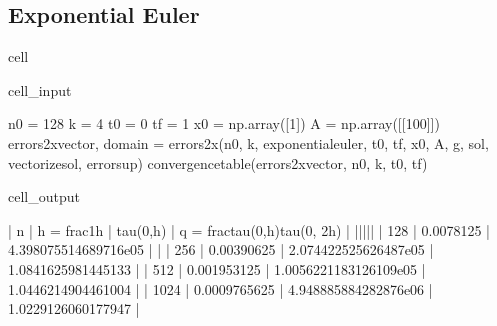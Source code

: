 \documentclass[letterpaper,10pt,english]{jupyterBook}
\begin{document}
\subsection{Exponential Euler}
\label{\detokenize{appendix:exponential-euler}}
\begin{sphinxuseclass}{cell}\begin{sphinxVerbatimInput}

\begin{sphinxuseclass}{cell_input}
\begin{sphinxVerbatim}[commandchars=\\\{\}]
n0 = 128
k = 4
t0 = 0
tf = 1
x0 = np.array([1])
A = np.array([[100]])
errors\PYGZus{}2x\PYGZus{}vector, domain = errors\PYGZus{}2x(n0, k, exponential\PYGZus{}euler, t0, tf, x0, A, g, sol, vectorize\PYGZus{}sol, error\PYGZus{}sup)
convergence\PYGZus{}table(errors\PYGZus{}2x\PYGZus{}vector, n0, k, t0, tf)
\end{sphinxVerbatim}

\end{sphinxuseclass}\end{sphinxVerbatimInput}
\begin{sphinxVerbatimOutput}

\begin{sphinxuseclass}{cell_output}
\begin{sphinxVerbatim}[commandchars=\\\{\}]
| n | h = \PYGZdl{}\PYGZbs{}frac\PYGZob{}1\PYGZcb{}\PYGZob{}h\PYGZcb{}\PYGZdl{} | \PYGZdl{}\PYGZbs{}tau(0,h)\PYGZdl{} | q = \PYGZdl{}\PYGZbs{}frac\PYGZob{}tau(0,h)\PYGZcb{}\PYGZob{}tau(0, 2h)\PYGZcb{}\PYGZdl{} |
|\PYGZhy{}\PYGZhy{}\PYGZhy{}|\PYGZhy{}\PYGZhy{}\PYGZhy{}\PYGZhy{}\PYGZhy{}\PYGZhy{}\PYGZhy{}\PYGZhy{}\PYGZhy{}\PYGZhy{}\PYGZhy{}\PYGZhy{}\PYGZhy{}\PYGZhy{}\PYGZhy{}\PYGZhy{}\PYGZhy{}|\PYGZhy{}\PYGZhy{}\PYGZhy{}\PYGZhy{}\PYGZhy{}\PYGZhy{}\PYGZhy{}\PYGZhy{}\PYGZhy{}\PYGZhy{}\PYGZhy{}|\PYGZhy{}\PYGZhy{}\PYGZhy{}\PYGZhy{}\PYGZhy{}\PYGZhy{}\PYGZhy{}\PYGZhy{}\PYGZhy{}\PYGZhy{}\PYGZhy{}\PYGZhy{}\PYGZhy{}\PYGZhy{}\PYGZhy{}\PYGZhy{}\PYGZhy{}\PYGZhy{}\PYGZhy{}\PYGZhy{}\PYGZhy{}\PYGZhy{}\PYGZhy{}\PYGZhy{}\PYGZhy{}\PYGZhy{}\PYGZhy{}\PYGZhy{}\PYGZhy{}\PYGZhy{}\PYGZhy{}\PYGZhy{}\PYGZhy{}|
 | 128 | 0.0078125 | 4.398075514689716e\PYGZhy{}05 | \PYGZhy{} | 
 | 256 | 0.00390625 | 2.074422525626487e\PYGZhy{}05 | 1.0841625981445133 | 
 | 512 | 0.001953125 | 1.0056221183126109e\PYGZhy{}05 | 1.0446214904461004 | 
 | 1024 | 0.0009765625 | 4.948885884282876e\PYGZhy{}06 | 1.0229126060177947 | 
\end{sphinxVerbatim}

\end{sphinxuseclass}\end{sphinxVerbatimOutput}

\end{sphinxuseclass}
\end{document}
